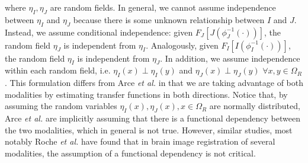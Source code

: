 where $\eta_{I}, \eta_{J}$ are random fields. In general, we cannot assume independence between $\eta_{I}$ and $\eta_{J}$ because there is some unknown relationship between $I$ and $J$.
Instead, we assume conditional independence: given $F_{J}[J(\phi_{J}^{-1}(\cdot))]$, the random field $\eta_{J}$ is independent from $\eta_{I}$. Analogously, given
$F_{I}[I(\phi_{I}^{-1}(\cdot))]$, the random field $\eta_{I}$ is independent from $\eta_{J}$. In addition, we assume independence within each random field, i.e.
\hbox{$\eta_{I}(x) \perp \eta_{I}(y)$} and \hbox{$\eta_{J}(x) \perp \eta_{J}(y)$} \hbox{$\forall x,y\in\Omega_{R}$}. This formulation differs from Arce {\it et al.} \cite{Arce-santana2014} in that
we are taking advantage of both modalities by estimating transfer functions in both directions. Notice that, by assuming the random variables
$\eta_{I}(x), \eta_{J}(x), x\in\Omega_{R}$ are normally distributed, Arce {\it et al.} \cite{Arce-santana2014} are implicitly assuming that there is a functional dependency
between the two modalities, which in general is not true. However, similar studies, most notably Roche {\it et al.} \cite{Roche1998} have found that in brain image registration of several
modalities, the assumption of a functional dependency is not critical.

